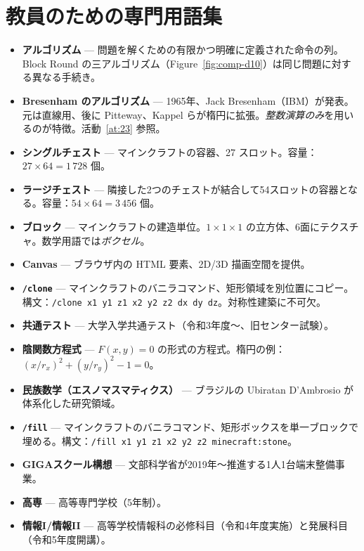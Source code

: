 \documentclass[12pt,a4paper]{scrartcl}
\newcommand{\code}[1]{\texttt{\small #1}}
\newcommand{\acc}[1]{\textcolor{accent}{\textbf{#1}}}
\newcommand{\cmd}[1]{\textcolor{earth}{\texttt{\small #1}}}
\begin{document}
\newpage
\section{教員のための専門用語集}\label{ap:glos}

\begin{itemize}[leftmargin=1.4em,itemsep=0.3em,topsep=0.3em]
  \item \acc{アルゴリズム} --- 問題を解くための有限かつ明確に定義された命令の列。Block Round の三アルゴリズム（Figure~\ref{fig:comp-d10}）は同じ問題に対する異なる手続き。
  \item \acc{Bresenham のアルゴリズム} --- 1965年、Jack Bresenham（IBM）が発表。元は直線用、後に Pitteway、Kappel らが楕円に拡張。\emph{整数演算のみ}を用いるのが特徴。活動~\ref{at:23} 参照。
  \item \acc{シングルチェスト} --- マインクラフトの容器、27 スロット。容量：$27 \times 64 = 1\,728$ 個。
  \item \acc{ラージチェスト} --- 隣接した2つのチェストが結合して54スロットの容器となる。容量：$54 \times 64 = 3\,456$ 個。
  \item \acc{ブロック} --- マインクラフトの建造単位。$1\times1\times1$ の立方体、6面にテクスチャ。数学用語では\emph{ボクセル}。
  \item \acc{Canvas} --- ブラウザ内の HTML 要素、2D/3D 描画空間を提供。
  \item \acc{\code{/clone}} --- マインクラフトのバニラコマンド、矩形領域を別位置にコピー。構文：\cmd{/clone x1 y1 z1 x2 y2 z2 dx dy dz}。対称性建築に不可欠。
  \item \acc{共通テスト} --- 大学入学共通テスト（令和3年度〜、旧センター試験）。
  \item \acc{陰関数方程式} --- $F(x, y) = 0$ の形式の方程式。楕円の例：$(x/r_x)^2 + (y/r_y)^2 - 1 = 0$。
  \item \acc{民族数学（エスノマスマティクス）} --- ブラジルの Ubiratan D'Ambrosio が体系化した研究領域。
  \item \acc{\code{/fill}} --- マインクラフトのバニラコマンド、矩形ボックスを単一ブロックで埋める。構文：\cmd{/fill x1 y1 z1 x2 y2 z2 minecraft:stone}。
  \item \acc{GIGAスクール構想} --- 文部科学省が2019年〜推進する1人1台端末整備事業。
  \item \acc{高専} --- 高等専門学校（5年制）。
  \item \acc{情報I/情報II} --- 高等学校情報科の必修科目（令和4年度実施）と発展科目（令和5年度開講）。

\end{itemize}
\end{document}
